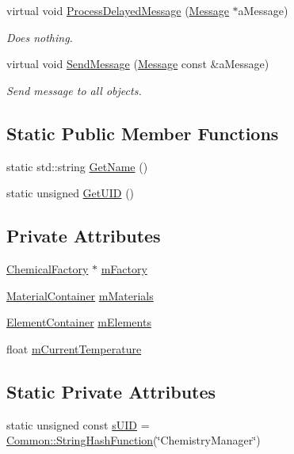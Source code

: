 \begin{DoxyCompactItemize}
virtual void \hyperlink{classChemistryManager_a19f683fb17327d395038f411bb1a963e}{Process\+Delayed\+Message} (\hyperlink{classMessage}{Message} $\ast$a\+Message)
\begin{DoxyCompactList}\small\item\em Does nothing. \end{DoxyCompactList}\item 
virtual void \hyperlink{classChemistryManager_a10dbb210239f8953f2f478f903bff7cb}{Send\+Message} (\hyperlink{classMessage}{Message} const \&a\+Message)
\begin{DoxyCompactList}\small\item\em Send message to all objects. \end{DoxyCompactList}\end{DoxyCompactItemize}
\subsection*{Static Public Member Functions}
\begin{DoxyCompactItemize}
\item 
static std\+::string \hyperlink{classChemistryManager_a15212234b2b9414da0a7f38fa2304118}{Get\+Name} ()
\item 
static unsigned \hyperlink{classChemistryManager_ac0b198780ea650928fc619e8e3ed45fc}{Get\+U\+ID} ()
\end{DoxyCompactItemize}
\subsection*{Private Attributes}
\begin{DoxyCompactItemize}
\item 
\hyperlink{classChemicalFactory}{Chemical\+Factory} $\ast$ \hyperlink{classChemistryManager_aa22d3fda73de4f1c415c6d324bffd8a8}{m\+Factory}
\item 
\hyperlink{classChemistryManager_aed6b958024dc4300fd9dfbbbcf819ac1}{Material\+Container} \hyperlink{classChemistryManager_a74ebac5a1fad5be1176f61e53620dc01}{m\+Materials}
\item 
\hyperlink{classChemistryManager_a497405ec5c9312ef9a37298ff3b2506c}{Element\+Container} \hyperlink{classChemistryManager_a206bd337c1434f05f699f43e3b76ddc2}{m\+Elements}
\item 
float \hyperlink{classChemistryManager_a90c66730ce549536a9259aa2e5da3ee3}{m\+Current\+Temperature}
\end{DoxyCompactItemize}
\subsection*{Static Private Attributes}
\begin{DoxyCompactItemize}
\item 
static unsigned const \hyperlink{classChemistryManager_a175125416f540c77e81629fd9d38a60a}{s\+U\+ID} = \hyperlink{namespaceCommon_a994c43a8ea7b03968186a635687a6521}{Common\+::\+String\+Hash\+Function}(\char`\"{}Chemistry\+Manager\char`\"{})
\end{DoxyCompactItemize}
